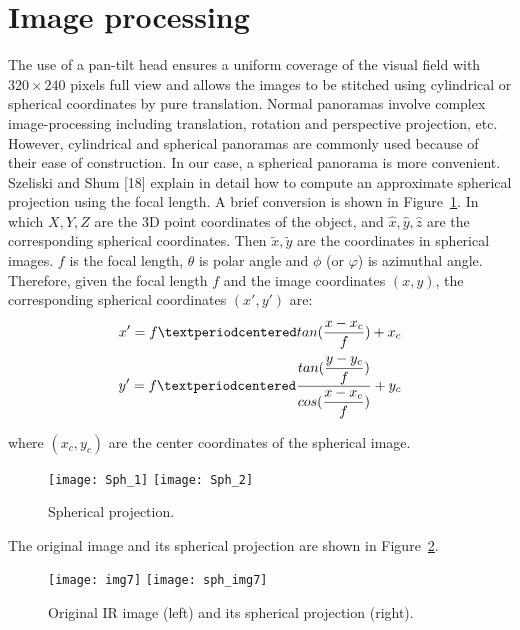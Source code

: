 \documentclass{tQRT2e}
\begin{document}
\section{Image processing}
The use of a pan-tilt head ensures a uniform coverage of the visual field with $ 320×240 $ pixels full view and allows the images to be stitched using cylindrical or spherical coordinates by pure translation. Normal panoramas involve complex image-processing including translation, rotation and perspective projection, etc. However, cylindrical and spherical panoramas are commonly used because of their ease of construction. In our case, a spherical panorama is more convenient. Szeliski and Shum [18] explain in detail how to compute an approximate spherical projection using the focal length. A brief conversion is shown in Figure~\ref{Sph_pro}. In which $X, Y, Z$ are the 3D point coordinates of the object, and $\hat{x}, \hat{y}, \hat{z}$ are the corresponding spherical coordinates. Then $\tilde{x}, \tilde{y}$ are the coordinates in spherical images. $f$ is the focal length, $\theta$ is polar angle and $\phi$ (or $\varphi$) is azimuthal angle. Therefore, given the focal length $ f $ and the image coordinates $ (x, y) $, the corresponding spherical coordinates $ (x', y') $ are:
\begin{align}
x'={} f·tan(\dfrac{x-x_c}{f})+x_c \notag \\
y'=f·\frac{tan(\dfrac{y-y_c}{f})}{cos(\dfrac{x-x_c}{f})} +y_c
\end{align}

where $ (x_c,y_c) $ are the center coordinates of the spherical image.
\begin{figure}[ht]
	\centering
	\texttt{[image: Sph\_1]}
	\texttt{[image: Sph\_2]}
	\caption{Spherical projection.}
	\label{Sph_pro}
\end{figure}

The original image and its spherical projection are shown in Figure~\ref{Orig_sph}.
\begin{figure}[ht]
	\centering
	\texttt{[image: img7]}
	\texttt{[image: sph\_img7]}
	\caption{Original IR image (left) and its spherical projection (right).}
	\label{Orig_sph}
\end{figure}
\end{document}
